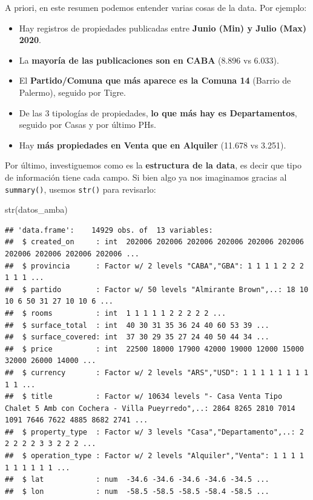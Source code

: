 \documentclass[
  spanish,
]{book}
\newenvironment{Shaded}{\begin{snugshade}}{\end{snugshade}}
\newcommand{\FunctionTok}[1]{\textcolor[rgb]{0.00,0.00,0.00}{#1}}
\newcommand{\NormalTok}[1]{#1}
\begin{document}
A priori, en este resumen podemos entender varias cosas de la data. Por ejemplo:

\begin{itemize}
\item
  Hay registros de propiedades publicadas entre \textbf{Junio (Min) y Julio (Max) 2020}.
\item
  La \textbf{mayoría de las publicaciones son en CABA} (8.896 vs 6.033).
\item
  El \textbf{Partido/Comuna que más aparece es la Comuna 14} (Barrio de Palermo), seguido por Tigre.
\item
  De las 3 tipologías de propiedades, \textbf{lo que más hay es Departamentos}, seguido por Casas y por último PHs.
\item
  Hay \textbf{más propiedades en Venta que en Alquiler} (11.678 vs 3.251).
\end{itemize}

Por último, investiguemos como es la \textbf{estructura de la data}, es decir que tipo de información tiene cada campo. Si bien algo ya nos imaginamos gracias al \texttt{summary()}, usemos \texttt{str()} para revisarlo:

\begin{Shaded}
\begin{Highlighting}[]
\FunctionTok{str}\NormalTok{(datos\_amba)}
\end{Highlighting}
\end{Shaded}

\begin{verbatim}
## 'data.frame':    14929 obs. of  13 variables:
##  $ created_on     : int  202006 202006 202006 202006 202006 202006 202006 202006 202006 202006 ...
##  $ provincia      : Factor w/ 2 levels "CABA","GBA": 1 1 1 1 2 2 2 1 1 1 ...
##  $ partido        : Factor w/ 50 levels "Almirante Brown",..: 18 10 10 6 50 31 27 10 10 6 ...
##  $ rooms          : int  1 1 1 1 1 2 2 2 2 2 ...
##  $ surface_total  : int  40 30 31 35 36 24 40 60 53 39 ...
##  $ surface_covered: int  37 30 29 35 27 24 40 50 44 34 ...
##  $ price          : int  22500 18000 17900 42000 19000 12000 15000 32000 26000 14000 ...
##  $ currency       : Factor w/ 2 levels "ARS","USD": 1 1 1 1 1 1 1 1 1 1 ...
##  $ title          : Factor w/ 10634 levels "- Casa Venta Tipo Chalet 5 Amb con Cochera - Villa Pueyrredo",..: 2864 8265 2810 7014 1091 7646 7622 4885 8682 2741 ...
##  $ property_type  : Factor w/ 3 levels "Casa","Departamento",..: 2 2 2 2 2 3 3 2 2 2 ...
##  $ operation_type : Factor w/ 2 levels "Alquiler","Venta": 1 1 1 1 1 1 1 1 1 1 ...
##  $ lat            : num  -34.6 -34.6 -34.6 -34.6 -34.5 ...
##  $ lon            : num  -58.5 -58.5 -58.5 -58.4 -58.5 ...
\end{verbatim}
\end{document}
